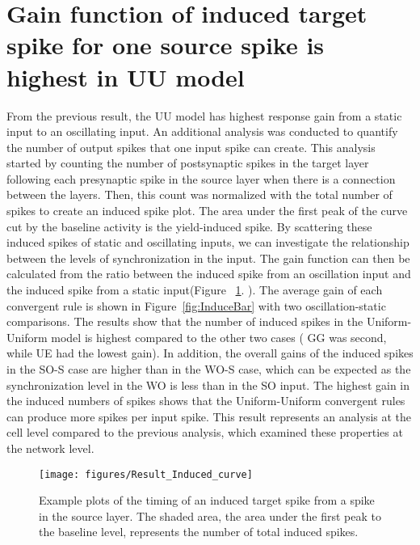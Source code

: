 \section{Gain function of induced target spike for one source spike is highest in UU model }
 From the previous result, the UU model has highest response gain from a static input to an oscillating input. An additional analysis was conducted to quantify the number of output spikes that one input spike can create. This analysis started by counting the number of postsynaptic spikes in the target layer following each presynaptic spike in the source layer when there is a connection between the layers. Then, this count was normalized with the total number of spikes to create an induced spike plot. The area under the first peak of the curve cut by the baseline activity is the yield-induced spike. By scattering these induced spikes of static and oscillating inputs, we can investigate the relationship between the levels of synchronization in the input. The gain function can then be calculated from the ratio between the induced spike from an oscillation input and the induced spike from a static input(Figure ~\ref{fig:InduceCurve}. ). The average gain of each convergent rule is shown in Figure~\ref{fig:InduceBar} with two oscillation-static comparisons. The results show that the number of induced spikes in the Uniform-Uniform model is highest compared to the other two cases ( GG was second, while UE had the lowest gain). In addition, the overall gains of the induced spikes in the SO-S case are higher than in the WO-S case, which can be expected as the synchronization level in the WO is less than in the SO input. The highest gain in the induced numbers of spikes shows that the Uniform-Uniform convergent rules can produce more spikes per input spike. This result represents an analysis at the cell level compared to the previous analysis, which examined these properties at the network level. 



\begin{figure}[!h]
	\centering
	\texttt{[image: figures/Result\_Induced\_curve]}
	\caption{Example plots of the timing of an induced target spike from a spike in the source layer. The shaded area, the area under the first peak to the baseline level, represents the number of total induced spikes.}
	\label{fig:InduceCurve}
\end{figure}

